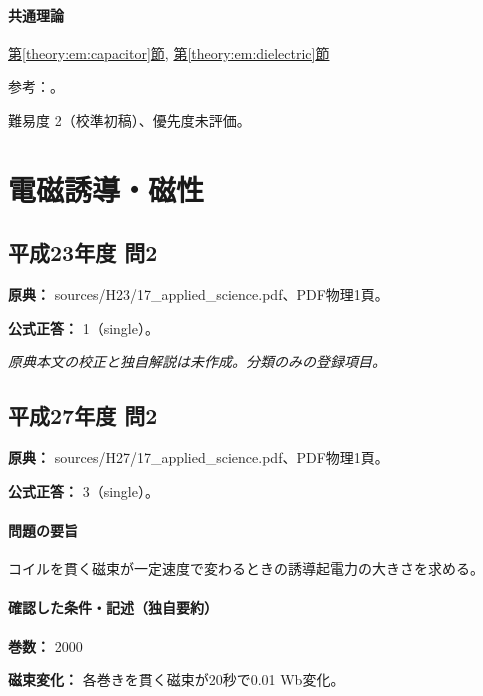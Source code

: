 \paragraph{共通理論} \hyperref[theory:em:capacitor]{第\ref*{theory:em:capacitor}節}, \hyperref[theory:em:dielectric]{第\ref*{theory:em:dielectric}節}

\par 参考：\cite{mit_em05}。

\par 難易度 2（校準初稿）、優先度未評価。

\section{電磁誘導・磁性}

\subsection{平成23年度 問2}
\label{q:h23-reg-applied-02}

\noindent\textbf{原典：} sources/H23/17\_applied\_science.pdf、PDF物理1頁。

\textbf{公式正答：} 1（single）。

\par\textit{原典本文の校正と独自解説は未作成。分類のみの登録項目。}

\subsection{平成27年度 問2}
\label{q:h27-reg-applied-02}

\noindent\textbf{原典：} sources/H27/17\_applied\_science.pdf、PDF物理1頁。

\textbf{公式正答：} 3（single）。

\paragraph{問題の要旨} コイルを貫く磁束が一定速度で変わるときの誘導起電力の大きさを求める。

\paragraph{確認した条件・記述（独自要約）}\mbox{}\par

\noindent\textbf{巻数：} 2000\par

\noindent\textbf{磁束変化：} 各巻きを貫く磁束が20秒で0.01 Wb変化。\par

